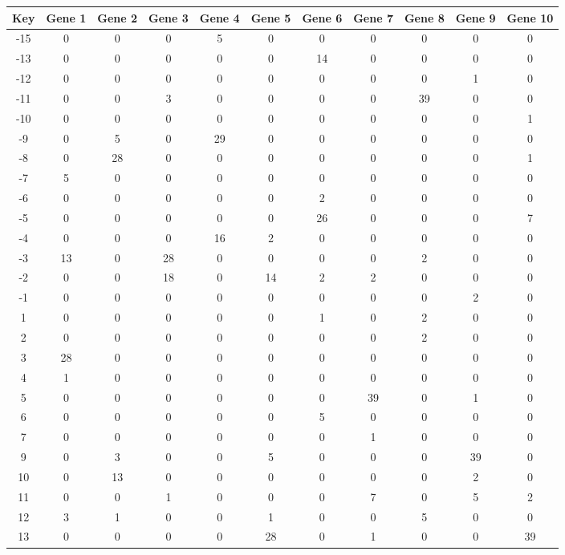 \begin{tabular}{|c|c|c|c|c|c|c|c|c|c|c|}
\hline
Key & Gene 1 & Gene 2 & Gene 3 & Gene 4 & Gene 5 & Gene 6 & Gene 7 & Gene 8 & Gene 9 & Gene 10 \\
\hline
-15 & 0 & 0 & 0 & 5 & 0 & 0 & 0 & 0 & 0 & 0 \\
-13 & 0 & 0 & 0 & 0 & 0 & 14 & 0 & 0 & 0 & 0 \\
-12 & 0 & 0 & 0 & 0 & 0 & 0 & 0 & 0 & 1 & 0 \\
-11 & 0 & 0 & 3 & 0 & 0 & 0 & 0 & 39 & 0 & 0 \\
-10 & 0 & 0 & 0 & 0 & 0 & 0 & 0 & 0 & 0 & 1 \\
-9 & 0 & 5 & 0 & 29 & 0 & 0 & 0 & 0 & 0 & 0 \\
-8 & 0 & 28 & 0 & 0 & 0 & 0 & 0 & 0 & 0 & 1 \\
-7 & 5 & 0 & 0 & 0 & 0 & 0 & 0 & 0 & 0 & 0 \\
-6 & 0 & 0 & 0 & 0 & 0 & 2 & 0 & 0 & 0 & 0 \\
-5 & 0 & 0 & 0 & 0 & 0 & 26 & 0 & 0 & 0 & 7 \\
-4 & 0 & 0 & 0 & 16 & 2 & 0 & 0 & 0 & 0 & 0 \\
-3 & 13 & 0 & 28 & 0 & 0 & 0 & 0 & 2 & 0 & 0 \\
-2 & 0 & 0 & 18 & 0 & 14 & 2 & 2 & 0 & 0 & 0 \\
-1 & 0 & 0 & 0 & 0 & 0 & 0 & 0 & 0 & 2 & 0 \\
1 & 0 & 0 & 0 & 0 & 0 & 1 & 0 & 2 & 0 & 0 \\
2 & 0 & 0 & 0 & 0 & 0 & 0 & 0 & 2 & 0 & 0 \\
3 & 28 & 0 & 0 & 0 & 0 & 0 & 0 & 0 & 0 & 0 \\
4 & 1 & 0 & 0 & 0 & 0 & 0 & 0 & 0 & 0 & 0 \\
5 & 0 & 0 & 0 & 0 & 0 & 0 & 39 & 0 & 1 & 0 \\
6 & 0 & 0 & 0 & 0 & 0 & 5 & 0 & 0 & 0 & 0 \\
7 & 0 & 0 & 0 & 0 & 0 & 0 & 1 & 0 & 0 & 0 \\
9 & 0 & 3 & 0 & 0 & 5 & 0 & 0 & 0 & 39 & 0 \\
10 & 0 & 13 & 0 & 0 & 0 & 0 & 0 & 0 & 2 & 0 \\
11 & 0 & 0 & 1 & 0 & 0 & 0 & 7 & 0 & 5 & 2 \\
12 & 3 & 1 & 0 & 0 & 1 & 0 & 0 & 5 & 0 & 0 \\
13 & 0 & 0 & 0 & 0 & 28 & 0 & 1 & 0 & 0 & 39 \\
\hline
\end{tabular}